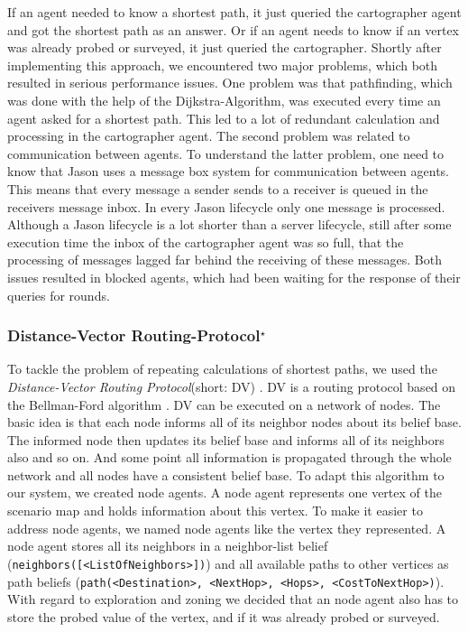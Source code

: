  If an agent needed to know a shortest path, it just queried the cartographer agent and got the shortest path as an answer. Or if an agent needs to know if an vertex was already probed or surveyed, it just queried the cartographer. Shortly after implementing this approach, we encountered two major problems, which both resulted in serious performance issues. One problem was that pathfinding, which was done with the help of the Dijkstra-Algorithm, was executed every time an agent asked for a shortest path. This led to a lot of redundant calculation and processing in the cartographer agent. The second problem was related to communication between agents. To understand the latter problem, one need to know that Jason uses a message box system for communication between agents. This means that every message a sender sends to a receiver is queued in the receivers message inbox. In every Jason lifecycle only one message is processed. Although a Jason lifecycle is a lot shorter than a server lifecycle, still after some execution time the inbox of the cartographer agent was so full, that the processing of messages lagged far behind the receiving of these messages. Both issues resulted in blocked agents, which had been waiting for the response of their queries for rounds.


\subsubsection[Distance-Vector Routing Protocol]{Distance-Vector Routing-Protocol$^\star$}\label{alg:map_dv}
To tackle the problem of repeating calculations of shortest paths, we used the \emph{Distance-Vector Routing Protocol}(short: DV) \cite{wiki:dvrp}. DV is a routing protocol based on the Bellman-Ford algorithm \cite{wiki:bellman_ford}. DV can be executed on a network of nodes. The basic idea is that each node informs all of its neighbor nodes about its belief base. The informed node then updates its belief base and informs all of its neighbors also and so on. And some point all information is propagated through the whole network and all nodes have a consistent belief base. To adapt this algorithm to our system, we created node agents. A node agent represents one vertex of the scenario map and holds information about this vertex. To make it easier to address node agents, we named node agents like the vertex they represented. A node agent stores all its neighbors in a neighbor-list belief (\texttt{neighbors([<ListOfNeighbors>])}) and all available paths to other vertices as path beliefs (\texttt{path(<Destination>, <NextHop>, <Hops>, <CostToNextHop>)}). With regard to exploration and zoning we decided that an node agent also has to store the probed value of the vertex, and if it was already probed or surveyed.

